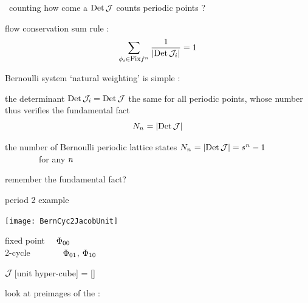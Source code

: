 \begin{frame}{\po\ counting}
how come a $\mbox{\rm Det}\,{\cal J}$ counts periodic points ?
\bigskip

\begin{block}{flow conservation sum rule :}
\[
\sum_{\phi_i{\in\mbox{\footnotesize Fix}f^{{n_{}}}}}
    \frac{1}{|\mbox{\rm Det}\,{\cal J}_i|}
    =1
\]
\end{block}
\medskip

Bernoulli system `natural weighting' is simple :
\medskip

the determinant
$\mbox{\rm Det}\,{\cal J}_i=\mbox{\rm Det}\,{\cal J}$ the same for all periodic points, whose
number thus verifies the {\color{blue}fundamental fact}
\[
N_{n_{}} = |\mbox{\rm Det}\,{\cal J}|
\] %

\medskip


\vfill
    \begin{block}{the number of Bernoulli periodic lattice states}
\(
N_{{n_{}}} = |\mbox{\rm Det}\,{\cal J}| = s^{{n_{}}} - 1
\) %
~~~~~~~~for any ${n_{}}$
    \end{block}
\end{frame} %

\begin{frame}{remember the fundamental fact?}
    \begin{block}{period 2 example}
\begin{center}
            \begin{minipage}[c]{0.32\textwidth}\begin{center}
\texttt{[image: BernCyc2JacobUnit]}
            \end{center}\end{minipage}
            \hspace{2ex}
            \begin{minipage}[c]{0.46\textwidth}
fixed point ~~$\Phi_{00}$\\
2-cycle ~~~~~~~$\Phi_{01}$, $\Phi_{10}$
            \end{minipage}
\end{center}
    \end{block}
\bigskip

${\cal J}\,$[unit hyper-cube] = [{\fundPip}]
\bigskip

look at preimages of the {\fundPip} :
\end{frame} %

